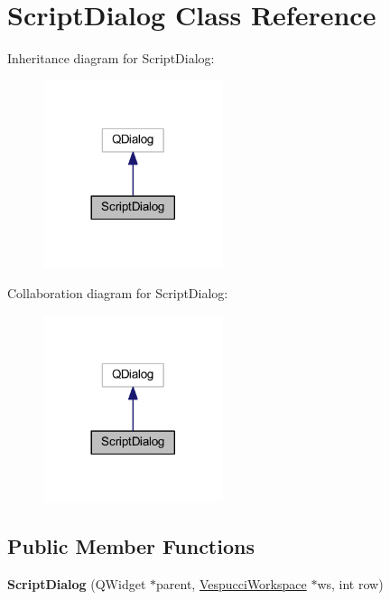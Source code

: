 \hypertarget{class_script_dialog}{\section{Script\+Dialog Class Reference}
\label{class_script_dialog}
}


Inheritance diagram for Script\+Dialog\+:\nopagebreak
\begin{figure}[H]
\begin{center}
\leavevmode
\includegraphics[width=149pt]{class_script_dialog__inherit__graph}
\end{center}
\end{figure}


Collaboration diagram for Script\+Dialog\+:\nopagebreak
\begin{figure}[H]
\begin{center}
\leavevmode
\includegraphics[width=149pt]{class_script_dialog__coll__graph}
\end{center}
\end{figure}
\subsection*{Public Member Functions}
\begin{DoxyCompactItemize}
\item 
\hypertarget{class_script_dialog_aa7310b38035f60720b1ee003e196c264}{{\bfseries Script\+Dialog} (Q\+Widget $\ast$parent, \hyperlink{class_vespucci_workspace}{Vespucci\+Workspace} $\ast$ws, int row)}\label{class_script_dialog_aa7310b38035f60720b1ee003e196c264}

\end{DoxyCompactItemize}


